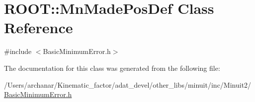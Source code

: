 \hypertarget{classROOT_1_1Minuit2_1_1BasicMinimumError_1_1MnMadePosDef}{}\section{R\+O\+OT\+:\+:Mn\+Made\+Pos\+Def Class Reference}
\label{classROOT_1_1Minuit2_1_1BasicMinimumError_1_1MnMadePosDef}


{\ttfamily \#include $<$Basic\+Minimum\+Error.\+h$>$}



The documentation for this class was generated from the following file\+:\begin{DoxyCompactItemize}
\item 
/\+Users/archanar/\+Kinematic\+\_\+factor/adat\+\_\+devel/other\+\_\+libs/minuit/inc/\+Minuit2/\mbox{\hyperlink{other__libs_2minuit_2inc_2Minuit2_2BasicMinimumError_8h}{Basic\+Minimum\+Error.\+h}}\end{DoxyCompactItemize}
